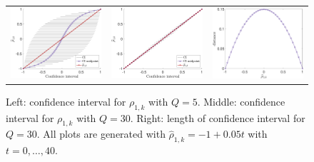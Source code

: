 \begin{figure}[!b]\centering
\begin{tabular}{ccc}
\includegraphics[width=0.3\linewidth]{./figures/CI_Q_5.pdf}&
\includegraphics[width=0.3\linewidth]{./figures/CI_Q_30.pdf}&
\includegraphics[width=0.3\linewidth]{./figures/CI_distance.pdf}
\end{tabular}
\caption{Left: confidence interval for $\rho_{1,k}$ with $Q=5$. Middle: confidence interval for $\rho_{1,k}$ with $Q=30$. Right: length of confidence interval for $Q=30$. All plots are generated with $\widehat \rho_{1,k}=-1+0.05t$ with $t=0,\ldots,40$.} 
\label{fig:CI_plot} 
\end{figure}
%

